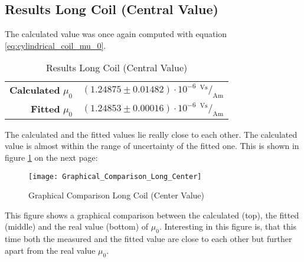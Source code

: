 \subsection{Results Long Coil (Central Value)}
\label{subsec:Results_Long_Coil_Central}
The calculated value was once again computed with equation \ref{eq:cylindrical_coil_mu_0}.
\begin{table}[H]
	\centering
	\renewcommand{\arraystretch}{1.3}
	\begin{tabular}{r l}
		\hline
		\textbf{Calculated} $\mu_0$ & $(1.24875\pm0.01482)\cdot10^{-6}\ \,^\text{Vs}\!/_\text{Am}$ \\
		\textbf{Fitted} $\mu_0$ & $(1.24853\pm0.00016)\cdot10^{-6}\ \,^\text{Vs}\!/_\text{Am}$ \\ \hline
	\end{tabular}
	\caption{Results Long Coil (Central Value)}
	\label{tab:Results_Long_Coil_Central}
\end{table}
The calculated and the fitted values lie really close to each other. The calculated value is almost within the range of uncertainty of the fitted one. This is shown in figure \ref{fig:Graphical_Comparison_Long_Center} on the next page:
\begin{figure}[H]
	\centering
	\texttt{[image: Graphical\_Comparison\_Long\_Center]}
	\caption{Graphical Comparison Long Coil (Center Value)}
	\label{fig:Graphical_Comparison_Long_Center}
\end{figure}
This figure shows a graphical comparison between the calculated (top), the fitted (middle) and the real value (bottom) of $\mu_0$. Interesting in this figure is, that this time both the measured and the fitted value are close to each other but further apart from the real value $\mu_0$.
